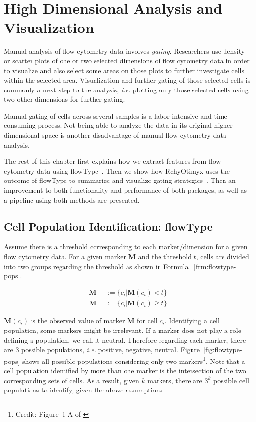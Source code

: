 \section{High Dimensional Analysis and Visualization}
Manual analysis of flow cytometry data involves \emph{gating}. Researchers use density or scatter plots of one or two selected dimensions  of flow cytometry data in order to visualize and also select some areas on those plots to further investigate cells within the selected area. Visualization and further gating of those selected cells is commonly a next step to the analysis, \emph{i.e.} plotting only those selected cells using two other dimensions for further gating.

Manual gating of cells across several samples is a labor intensive and time consuming process. Not being able to analyze the data in its original higher dimensional space is another disadvantage of manual flow cytometry data analysis.

The rest of this chapter first explains how we extract features from flow cytometry data using flowType~\cite{Aghaeepour2012}. Then we show how RchyOtimyx uses the outcome of flowType to summarize and visualize gating strategies~\cite{Aghaeepour2012a}. Then an improvement to both functionality and performance of both packages, as well as a pipeline using both methods are presented.

\subsection{Cell Population Identification: flowType}
\label{sec:fcs:flowType}
Assume there is a threshold corresponding to each marker/dimension for a given flow cytometry data. For a given marker $\mathbf{M}$ and the threshold $t$, cells are divided into two groups regarding the threshold as shown in Formula ~\ref{frm:flowtype-pops}.

\begin{align}
  \mathbf{M^-} &:= \{c_i | \mathbf{M}(c_i) < t \} \nonumber \\  
  \mathbf{M^+} &:= \{c_i | \mathbf{M}(c_i) \ge t \}
  \label{frm:flowtype-pops}
\end{align}

$\mathbf{M}(c_i)$ is the observed value of marker $\mathbf{M}$ for cell $c_i$. Identifying a cell population, some markers might be irrelevant. If a marker does not play a role defining a population, we call it neutral. Therefore regarding each marker, there are $3$ possible populations, \emph{i.e.} positive, negative, neutral. Figure~\ref{fig:flowtype-pops} shows all possible populations considering only two markers\footnote{Credit: Figure~1-A of \cite{Aghaeepour2012}}. Note that a cell population identified by more than one marker is the intersection of the two corresponding sets of cells. As a result, given $k$ markers, there are $3^k$ possible cell populations to identify, given the above assumptions.

